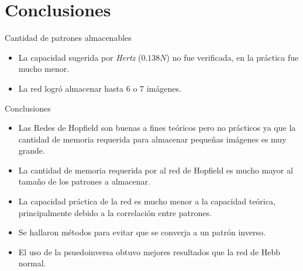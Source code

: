 \documentclass{beamer}
\begin{document}
\section{Conclusiones}

\begin{frame}{Cantidad de patrones almacenables}
\begin{itemize}
\item \Large La capacidad sugerida por \textit{Hertz} ($0.138N$) no fue verificada, en la práctica fue mucho menor.
\item \Large La red logró almacenar hasta 6 o 7 imágenes.
\end{itemize}
\end{frame}

\begin{frame}{Conclusiones}
\begin{itemize}
\item Las Redes de Hopfield son buenas a fines teóricos pero no prácticos ya que la cantidad de memoria requerida para almacenar pequeñas imágenes es muy grande.
\item La cantidad de memoria requerida por al red de Hopfield es mucho mayor al tamaño de 
los patrones a almacenar.
\item La capacidad práctica de la red es mucho menor a la capacidad teórica, principalmente 
debido a la correlación entre patrones.
\item Se hallaron métodos para evitar que se converja a un patrón inverso.
\item El uso de la psuedoinversa obtuvo mejores resultados que la red de Hebb normal.
\end{itemize}
\end{frame}
\end{document}
